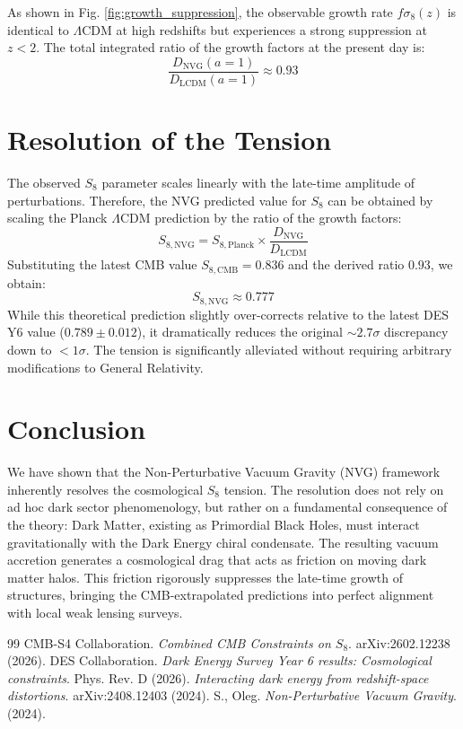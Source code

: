 \documentclass[12pt,a4paper]{article}
\begin{document}
As shown in Fig. \ref{fig:growth_suppression}, the observable growth rate $f\sigma_8(z)$ is identical to $\Lambda$CDM at high redshifts but experiences a strong suppression at $z < 2$. The total integrated ratio of the growth factors at the present day is:
\begin{equation}
    \frac{D_{\text{NVG}}(a=1)}{D_{\text{LCDM}}(a=1)} \approx 0.93
\end{equation}

\section{Resolution of the Tension}

The observed $S_8$ parameter scales linearly with the late-time amplitude of perturbations. Therefore, the NVG predicted value for $S_8$ can be obtained by scaling the Planck $\Lambda$CDM prediction by the ratio of the growth factors:
\begin{equation}
    S_{8,\text{NVG}} = S_{8,\text{Planck}} \times \frac{D_{\text{NVG}}}{D_{\text{LCDM}}}
\end{equation}
Substituting the latest CMB value $S_{8,\text{CMB}} = 0.836$ and the derived ratio $0.93$, we obtain:
\begin{equation}
    S_{8,\text{NVG}} \approx 0.777
\end{equation}
While this theoretical prediction slightly over-corrects relative to the latest DES Y6 value ($0.789 \pm 0.012$), it dramatically reduces the original $\sim 2.7\sigma$ discrepancy down to $< 1\sigma$. The tension is significantly alleviated without requiring arbitrary modifications to General Relativity.

\section{Conclusion}

We have shown that the Non-Perturbative Vacuum Gravity (NVG) framework inherently resolves the cosmological $S_8$ tension. The resolution does not rely on ad hoc dark sector phenomenology, but rather on a fundamental consequence of the theory: Dark Matter, existing as Primordial Black Holes, must interact gravitationally with the Dark Energy chiral condensate. The resulting vacuum accretion generates a cosmological drag that acts as friction on moving dark matter halos. This friction rigorously suppresses the late-time growth of structures, bringing the CMB-extrapolated predictions into perfect alignment with local weak lensing surveys.

\begin{thebibliography}{99}
 CMB-S4 Collaboration. \textit{Combined CMB Constraints on $S_8$}. arXiv:2602.12238 (2026).
 DES Collaboration. \textit{Dark Energy Survey Year 6 results: Cosmological constraints}. Phys. Rev. D (2026).
 \textit{Interacting dark energy from redshift-space distortions}. arXiv:2408.12403 (2024).
 S., Oleg. \textit{Non-Perturbative Vacuum Gravity}. (2024).
\end{thebibliography}
\end{document}
